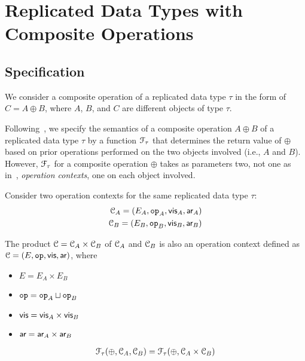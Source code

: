 
\section{Replicated Data Types with Composite Operations}

\subsection{Specification}	\label{ss:rdt-composite-spec}

We consider a composite operation of a replicated data type $\tau$ 
in the form of $C = A \oplus B$, 
where $A$, $B$, and $C$ are different objects of type $\tau$.

Following~\cite{Burckhardt:POPL14}, we specify the semantics of 
a composite operation $A \oplus B$ of a replicated data type $\tau$
by a function $\mathcal{F}_{\tau}$ that determines the return value of $\oplus$ 
based on prior operations performed on the two objects involved (i.e., $A$ and $B$).
However, $\mathcal{F}_{\tau}$ for a composite operation $\oplus$ 
takes as parameters two, not one as in~\cite{Burckhardt:POPL14}, 
\emph{operation contexts}, one on each object involved.

\begin{definition}
  Consider two operation contexts for the same replicated data type $\tau$:
  \begin{align}
    \mathcal{C}_{A} = (E_A, \texttt{op}_{A}, \textsf{vis}_{A}, \textsf{ar}_{A}) \\
    \mathcal{C}_{B} = (E_B, \texttt{op}_{B}, \textsf{vis}_{B}, \textsf{ar}_{B})
  \end{align}

  The product $\mathcal{C} = \mathcal{C}_{A} \times \mathcal{C}_{B}$ of $\mathcal{C}_{A}$ and $\mathcal{C}_{B}$ 
  is also an operation context defined as $\mathcal{C} = (E, \texttt{op}, \textsf{vis}, \textsf{ar})$, where
  \begin{itemize}
    \item $E = E_A \times E_B$
    \item $\texttt{op} = \texttt{op}_{A} \sqcup \texttt{op}_{B}$
    \item $\textsf{vis} = \textsf{vis}_{A} \times \textsf{vis}_{B}$
    \item $\textsf{ar} = \textsf{ar}_{A} \times \textsf{ar}_{B}$
  \end{itemize}
\end{definition}

\begin{definition}
  \begin{align}
    \mathcal{F}_{\tau}(\oplus, \mathcal{C}_{A}, \mathcal{C}_{B}) 
    = \mathcal{F}_{\tau}(\oplus, \mathcal{C}_{A} \times \mathcal{C}_{B})
  \end{align}
\end{definition}
